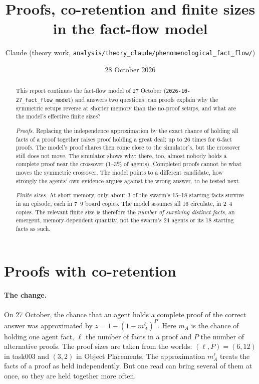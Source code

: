 \documentclass[10pt,a4paper]{article}
\title{\textbf{Proofs, co-retention and finite sizes}\\[2pt]
\textbf{in the fact-flow model}}
\author{Claude (theory work, \nolinkurl{analysis/theory_claude/phenomenological_fact_flow/})}
\date{28 October 2026}
\begin{document}
\maketitle

\begin{abstract}
\noindent
This report continues the fact-flow model of 27 October (\nolinkurl{2026-10-27_fact_flow_model}) and answers two
questions: can proofs explain why the symmetric setups reverse at shorter memory than the no-proof setups, and what are
the model's effective finite sizes?

\emph{Proofs.} Replacing the independence approximation by the exact chance of holding all facts of a proof together
raises proof holding a great deal: up to 26 times for 6-fact proofs. The model's proof shares then come close to the
simulator's, but the crossover still does not move. The simulator shows why: there, too, almost nobody holds a complete
proof near the crossover (1--3\% of agents). Completed proofs cannot be what moves the symmetric crossover. The model
points to a different candidate, how strongly the agents' own evidence argues against the wrong answer, to be tested
next.

\emph{Finite sizes.} At short memory, only about 3 of the swarm's 15--18 starting facts survive in an episode, each in
7--9 board copies. The model assumes all 16 circulate, in 2--4 copies. The relevant finite size is therefore the
\emph{number of surviving distinct facts}, an emergent, memory-dependent quantity, not the swarm's 24 agents or its 18
starting facts as such.
\end{abstract}

\section{Proofs with co-retention}
\paragraph{The change.} On 27 October, the chance that an agent holds a complete proof of the correct answer was
approximated by $z=1-(1-m_A^{\ell})^P$. Here $m_A$ is the chance of holding one agent fact, $\ell$ the number of facts in
a proof and $P$ the number of alternative proofs. The proof sizes are taken from the worlds: $(\ell,P)=(6,12)$ in
task003 and $(3,2)$ in Object Placements. The approximation $m_A^\ell$ treats the facts of a proof as held independently.
But one read can bring several of them at once, so they are held together more often.
\end{document}
